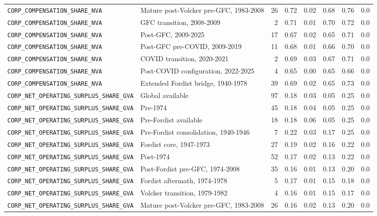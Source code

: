 \begin{landscape}
\begin{longtable}{p{4.4cm}p{3.8cm}rrrrrr}
\\
\nolinkurl{CORP_COMPENSATION_SHARE_NVA} & Mature post-Volcker pre-GFC, 1983-2008 & 26 & 0.72 & 0.02 & 0.68 & 0.76 & 0.0
\\
\nolinkurl{CORP_COMPENSATION_SHARE_NVA} & GFC transition, 2008-2009 & 2 & 0.71 & 0.01 & 0.70 & 0.72 & 0.0
\\
\nolinkurl{CORP_COMPENSATION_SHARE_NVA} & Post-GFC, 2009-2025 & 17 & 0.67 & 0.02 & 0.65 & 0.71 & 0.0
\\
\nolinkurl{CORP_COMPENSATION_SHARE_NVA} & Post-GFC pre-COVID, 2009-2019 & 11 & 0.68 & 0.01 & 0.66 & 0.70 & 0.0
\\
\nolinkurl{CORP_COMPENSATION_SHARE_NVA} & COVID transition, 2020-2021 & 2 & 0.69 & 0.03 & 0.67 & 0.71 & 0.0
\\
\nolinkurl{CORP_COMPENSATION_SHARE_NVA} & Post-COVID configuration, 2022-2025 & 4 & 0.65 & 0.00 & 0.65 & 0.66 & 0.0
\\
\nolinkurl{CORP_COMPENSATION_SHARE_NVA} & Extended Fordist bridge, 1940-1978 & 39 & 0.69 & 0.02 & 0.65 & 0.73 & 0.0
\\
\nolinkurl{CORP_NET_OPERATING_SURPLUS_SHARE_GVA} & Global available & 97 & 0.18 & 0.03 & 0.05 & 0.25 & 0.0
\\
\nolinkurl{CORP_NET_OPERATING_SURPLUS_SHARE_GVA} & Pre-1974 & 45 & 0.18 & 0.04 & 0.05 & 0.25 & 0.0
\\
\nolinkurl{CORP_NET_OPERATING_SURPLUS_SHARE_GVA} & Pre-Fordist available & 18 & 0.18 & 0.06 & 0.05 & 0.25 & 0.0
\\
\nolinkurl{CORP_NET_OPERATING_SURPLUS_SHARE_GVA} & Pre-Fordist consolidation, 1940-1946 & 7 & 0.22 & 0.03 & 0.17 & 0.25 & 0.0
\\
\nolinkurl{CORP_NET_OPERATING_SURPLUS_SHARE_GVA} & Fordist core, 1947-1973 & 27 & 0.19 & 0.02 & 0.16 & 0.22 & 0.0
\\
\nolinkurl{CORP_NET_OPERATING_SURPLUS_SHARE_GVA} & Post-1974 & 52 & 0.17 & 0.02 & 0.13 & 0.22 & 0.0
\\
\nolinkurl{CORP_NET_OPERATING_SURPLUS_SHARE_GVA} & Post-Fordist pre-GFC, 1974-2008 & 35 & 0.16 & 0.01 & 0.13 & 0.20 & 0.0
\\
\nolinkurl{CORP_NET_OPERATING_SURPLUS_SHARE_GVA} & Fordist aftermath, 1974-1978 & 5 & 0.17 & 0.01 & 0.15 & 0.18 & 0.0
\\
\nolinkurl{CORP_NET_OPERATING_SURPLUS_SHARE_GVA} & Volcker transition, 1979-1982 & 4 & 0.16 & 0.01 & 0.15 & 0.17 & 0.0
\\
\nolinkurl{CORP_NET_OPERATING_SURPLUS_SHARE_GVA} & Mature post-Volcker pre-GFC, 1983-2008 & 26 & 0.16 & 0.02 & 0.13 & 0.20 & 0.0

\end{longtable}
\end{landscape}
